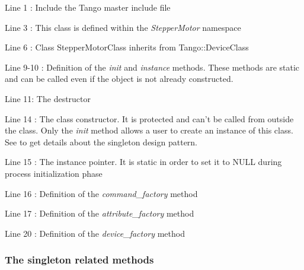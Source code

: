 Line 1 : Include the Tango master include file

Line 3 : This class is defined within the \emph{StepperMotor} namespace

Line 6 : Class StepperMotorClass inherits from Tango::DeviceClass

Line 9-10 : Definition of the \emph{init} and \emph{instance}
methods. These methods are static and can be called even if the object
is not already constructed.

Line 11: The destructor

Line 14 : The class constructor. It is protected and can't be called
from outside the class. Only the \emph{init} method allows a user
to create an instance of this class. See \cite{Patterns} to get details
about the singleton design pattern.

Line 15 : The instance pointer. It is static in order to set it to
NULL during process initialization phase

Line 16 : Definition of the \emph{command\_factory}
method

Line 17 : Definition of the \emph{attribute\_factory}
method

Line 20 : Definition of the \emph{device\_factory}
method


\subsubsection{The singleton related methods}



